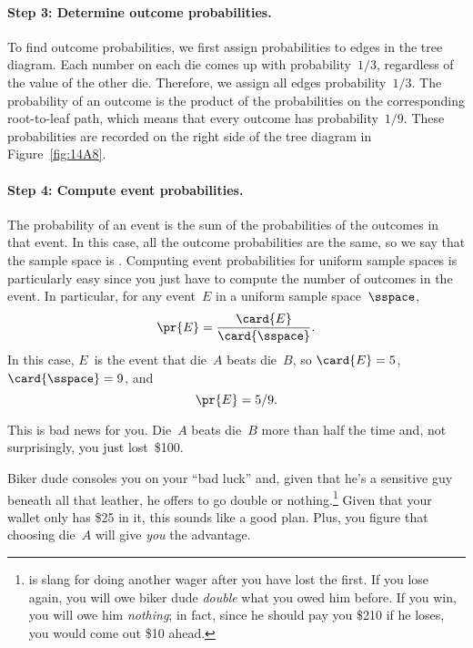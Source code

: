 \paragraph{Step 3: Determine outcome probabilities.}

To find outcome probabilities, we first assign probabilities to edges
in the tree diagram.  Each number on each die comes up with
probability~$1/3$, regardless of the value of the other die.
Therefore, we assign all edges probability~$1/3$.  The probability of
an outcome is the product of the probabilities on the corresponding
root-to-leaf path, which means that every outcome has
probability~$1/9$.  These probabilities are recorded on the right side
of the tree diagram in Figure~\ref{fig:14A8}.

\paragraph{Step 4: Compute event probabilities.}

The probability of an event is the sum of the probabilities of the
outcomes in that event.  In this case, all the outcome probabilities
are the same, so we say that the sample space is \emph{}.
Computing event probabilities for uniform sample spaces is
particularly easy since you just have to compute the number of
outcomes in the event.  In particular, for any event~$E$ in a uniform
sample space~$\sspace$,
\begin{equation}\label{eqn:14F1}
    \pr{E} = \frac{\card{E}}{\card{\sspace}}.
\end{equation}
In this case, $E$~is the event that die~$A$ beats die~$B$, so
$\card{E} = 5$, \ $\card{\sspace} = 9$, and
\begin{equation*}
    \pr{E} = 5/9.
\end{equation*}

This is bad news for you.  Die~$A$ beats die~$B$ more than half the
time and, not surprisingly, you just lost~\$100.

Biker dude consoles you on your ``bad luck'' and, given that he's a
sensitive guy beneath all that leather, he offers to go double or
nothing.\footnote{ is slang for doing another
  wager after you have lost the first.  If you lose again, you will
  owe biker dude \emph{double} what you owed him before.  If you win,
  you will owe him \emph{nothing}; in fact, since he should pay you
  \$210 if he loses, you would come out \$10 ahead.}  Given that your
wallet only has \$25 in it, this sounds like a good plan.  Plus, you
figure that choosing die~$A$ will give \emph{you} the advantage.

